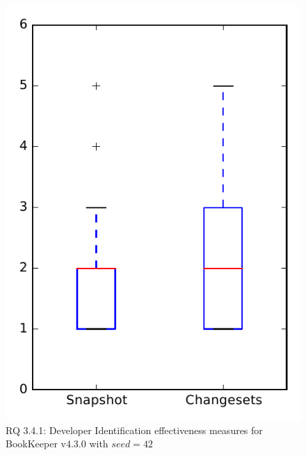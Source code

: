 
\begin{figure}
\centering
\includegraphics[height=0.4\textheight]{figures/dit_seed/rq1_bookkeeper_42}
\caption{RQ 3.4.1: Developer Identification effectiveness measures for BookKeeper v4.3.0 with $seed=42$}
\label{fig:dit_seed:rq1:bookkeeper}
\end{figure}

